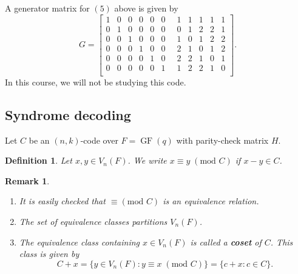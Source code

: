\documentclass[10pt]{article}
\DeclareMathOperator{\GF}{GF}
\theoremstyle{newstyle}
\newtheorem{remark}[thm]{Remark}
\newtheorem{defn}[thm]{Definition}
\begin{document}
A generator matrix for $(5)$ above is given by 
\[ G = \left[
\begin{array}{cccccc|ccccc}
1 & 0 & 0 & 0 & 0 & 0 \;&\; 1 & 1 & 1 & 1 & 1 \\
0 & 1 & 0 & 0 & 0 & 0 \;&\; 0 & 1 & 2 & 2 & 1 \\
0 & 0 & 1 & 0 & 0 & 0 \;&\; 1 & 0 & 1 & 2 & 2 \\
0 & 0 & 0 & 1 & 0 & 0 \;&\; 2 & 1 & 0 & 1 & 2 \\
0 & 0 & 0 & 0 & 1 & 0 \;&\; 2 & 2 & 1 & 0 & 1 \\
0 & 0 & 0 & 0 & 0 & 1 \;&\; 1 & 2 & 2 & 1 & 0 \\\end{array}
\right]. \]
In this course, we will not be studying this code. 

\subsection{Syndrome decoding}

Let $C$ be an $(n, k)$-code over $F = \GF(q)$ with parity-check matrix $H$. 

\begin{defn}
Let $x, y \in V_n(F)$. We write $x \equiv y \; (\text{mod } C)$ if $x - y \in C$. 
\end{defn}

\newpage 
\begin{remark}~
\begin{enumerate}[(1)]
    \item It is easily checked that $\equiv (\text{mod } C)$ is an equivalence relation. 
    \item The set of equivalence classes partitions $V_n(F)$. 
    \item The equivalence class containing $x \in V_n(F)$ is called a {\bf coset} of $C$. 
    This class is given by 
    \[ C + x = \{y \in V_n(F) : y \equiv x \; (\text{mod } C)\} = \{c + x : c \in C\}. \]
\end{enumerate}
\end{remark}
\end{document}
